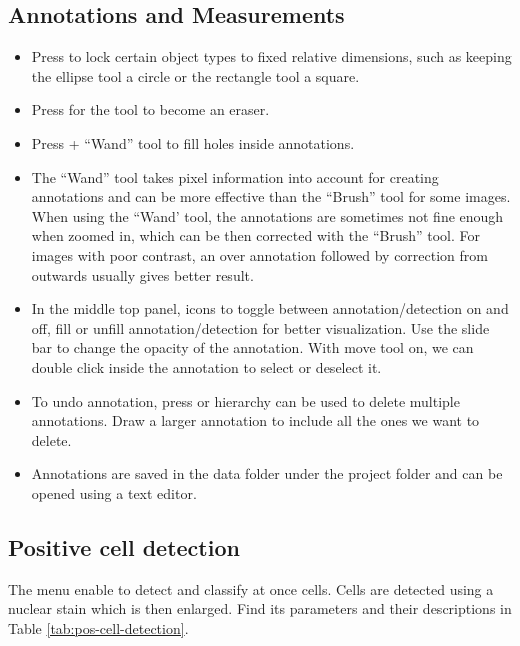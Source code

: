 \documentclass[a4paper,DIV=17,dvipsnames,headsepline]{scrartcl}
\begin{document}
\subsection{Annotations and Measurements}
\begin{itemize}
    \item Press \keys{\shift} to lock certain object types to fixed relative dimensions, such as keeping the ellipse tool a circle or the rectangle tool a square. 
    \item Press \keys{\Alt} for the tool to become an eraser. 
    \item Press \menu{\Alt} + ``Wand'' tool to fill holes inside annotations. 
    \item The ``Wand'' tool takes pixel information into account for creating annotations and can be more effective  than the ``Brush'' tool for some images. When using the ``Wand' tool, the annotations are sometimes not fine enough when zoomed in, which can be then corrected with the ``Brush'' tool. For images with poor contrast, an over annotation followed by correction from outwards usually gives better result.
    \item In the middle top panel, icons to toggle between annotation/detection on and off, fill or unfill annotation/detection for better visualization. Use the slide bar to change the opacity of the annotation. With move tool on, we can double click inside the annotation to select or deselect it.
    \item To undo annotation, press  or hierarchy can be used to delete multiple annotations. Draw a larger annotation to include all the ones we want to delete.    
    \item Annotations are saved in the data folder under the project folder and can be opened using a text editor.
\end{itemize}

\subsection{Positive cell detection}
The menu  enable to detect and classify at once cells. Cells are detected using a nuclear stain which is then enlarged. Find its parameters and their descriptions in Table \ref{tab:pos-cell-detection}.
\end{document}
